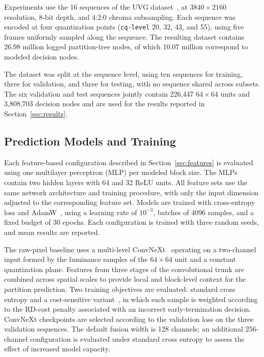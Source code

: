 \documentclass{article}
\begin{document}
Experiments use the 16 sequences of the UVG dataset~\cite{mercat2020uvgdataset}, at $3840\times2160$ resolution, 8-bit depth, and 4:2:0 chroma subsampling. Each sequence was encoded at four quantization points (\texttt{cq-level} 20, 32, 43, and 55), using five frames uniformly sampled along the sequence. The resulting dataset contains 26.98 million logged partition-tree nodes, of which 10.07 million correspond to modeled decision nodes.

The dataset was split at the sequence level, using ten sequences for training, three for validation, and three for testing, with no sequence shared across subsets. The six validation and test sequences jointly contain 226,447 $64\times64$ units and 3,808,703 decision nodes and are used for the results reported in Section~\ref{sec:results}.

\subsection{Prediction Models and Training}

Each feature-based configuration described in Section~\ref{sec:features} is evaluated using one multilayer perceptron (MLP) per modeled block size. The MLPs contain two hidden layers with 64 and 32 ReLU units. All feature sets use the same network architecture and training procedure, with only the input dimension adjusted to the corresponding feature set. Models are trained with cross-entropy loss and AdamW~\cite{loshchilov2019adamw}, using a learning rate of $10^{-3}$, batches of 4096 samples, and a fixed budget of 30 epochs. Each configuration is trained with three random seeds, and mean results are reported.

The raw-pixel baseline uses a multi-level ConvNeXt~\cite{liu2022convnext} operating on a two-channel input formed by the luminance samples of the $64\times64$ unit and a constant quantization plane. Features from three stages of the convolutional trunk are combined across spatial scales to provide local and block-level context for the partition prediction. Two training objectives are evaluated: standard cross entropy and a cost-sensitive variant~\cite{elkan2001costsensitivelearning}, in which each sample is weighted according to the RD-cost penalty associated with an incorrect early-termination decision. ConvNeXt checkpoints are selected according to the validation loss on the three validation sequences. The default fusion width is 128 channels; an additional 256-channel configuration is evaluated under standard cross entropy to assess the effect of increased model capacity.
\end{document}
